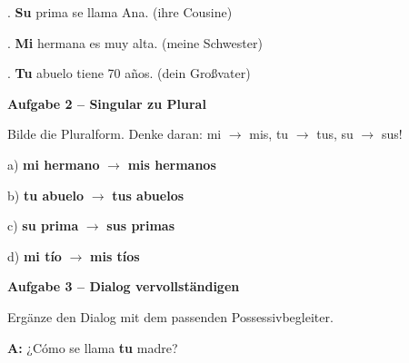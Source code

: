 \documentclass[11pt, a4paper]{article}
\newcommand{\fachfarbe}{spanisch}
\newcommand{\punktebox}[1]{\hfill\fbox{\small \_/#1}}
\newcommand{\lsg}[1]{\textcolor{loesung}{\textbf{#1}}}
\newenvironment{aufgabe}[1]{%
    \needspace{5\baselineskip}%
    \nopagebreak[4]%
    \vspace{10pt}
    \noindent\textbf{\textcolor{\fachfarbe}{Aufgabe #1}}
    \nopagebreak[4]%
    \vspace{5pt}
    \nopagebreak[4]%
    \begin{list}{}{\leftmargin=0pt}
    \item[]
}{%
    \end{list}
}
\newcommand{\es}[1]{\textcolor{\fachfarbe}{\textbf{#1}}}
\begin{document}
\vspace{0.8em}

. \lsg{Su} prima se llama Ana. \hfill (ihre Cousine)

\vspace{0.8em}

. \lsg{Mi} hermana es muy alta. \hfill (meine Schwester)

\vspace{0.8em}

. \lsg{Tu} abuelo tiene 70 años. \hfill (dein Großvater)

\vspace{15pt}


\begin{aufgabe}{2 -- Singular zu Plural}
Bilde die Pluralform. Denke daran: mi $\rightarrow$ mis, tu $\rightarrow$ tus, su $\rightarrow$ sus! \punktebox{8}
\end{aufgabe}

\noindent
a) \es{mi hermano} $\rightarrow$ \lsg{mis hermanos}

\vspace{0.8em}

\noindent
b) \es{tu abuelo} $\rightarrow$ \lsg{tus abuelos}

\vspace{0.8em}

\noindent
c) \es{su prima} $\rightarrow$ \lsg{sus primas}

\vspace{0.8em}

\noindent
d) \es{mi tío} $\rightarrow$ \lsg{mis tíos}

\vspace{15pt}


\begin{aufgabe}{3 -- Dialog vervollständigen}
Ergänze den Dialog mit dem passenden Possessivbegleiter. \punktebox{10}
\end{aufgabe}

\noindent
\textbf{A:} ¿Cómo se llama \lsg{tu} madre?

\vspace{0.8em}
\end{document}
